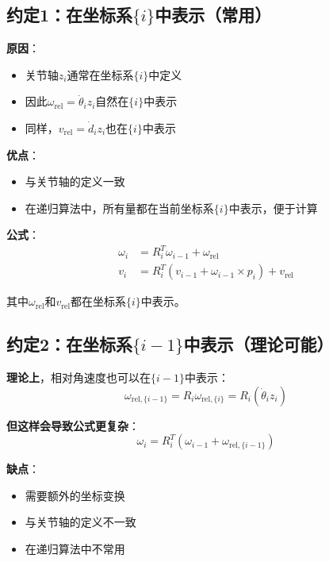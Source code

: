 \documentclass[12pt,a4paper]{article}
\begin{document}
\subsection{约定1：在坐标系$\{i\}$中表示（常用）}

\textbf{原因}：
\begin{itemize}
\item 关节轴$z_i$通常在坐标系$\{i\}$中定义
\item 因此$\omega_{\text{rel}} = \dot{\theta}_i z_i$自然在$\{i\}$中表示
\item 同样，$v_{\text{rel}} = \dot{d}_i z_i$也在$\{i\}$中表示
\end{itemize}

\textbf{优点}：
\begin{itemize}
\item 与关节轴的定义一致
\item 在递归算法中，所有量都在当前坐标系$\{i\}$中表示，便于计算
\end{itemize}

\textbf{公式}：
\begin{align}
\omega_i &= R_i^T \omega_{i-1} + \omega_{\text{rel}} \tag{3} \\
v_i &= R_i^T (v_{i-1} + \omega_{i-1} \times p_i) + v_{\text{rel}} \tag{4}
\end{align}

其中$\omega_{\text{rel}}$和$v_{\text{rel}}$都在坐标系$\{i\}$中表示。

\subsection{约定2：在坐标系$\{i-1\}$中表示（理论可能）}

\textbf{理论上}，相对角速度也可以在$\{i-1\}$中表示：
\begin{equation}
\omega_{\text{rel},\{i-1\}} = R_i \omega_{\text{rel},\{i\}} = R_i (\dot{\theta}_i z_i)
\end{equation}

\textbf{但这样会导致公式更复杂}：
\begin{equation}
\omega_i = R_i^T (\omega_{i-1} + \omega_{\text{rel},\{i-1\}})
\end{equation}

\textbf{缺点}：
\begin{itemize}
\item 需要额外的坐标变换
\item 与关节轴的定义不一致
\item 在递归算法中不常用
\end{itemize}
\end{document}
